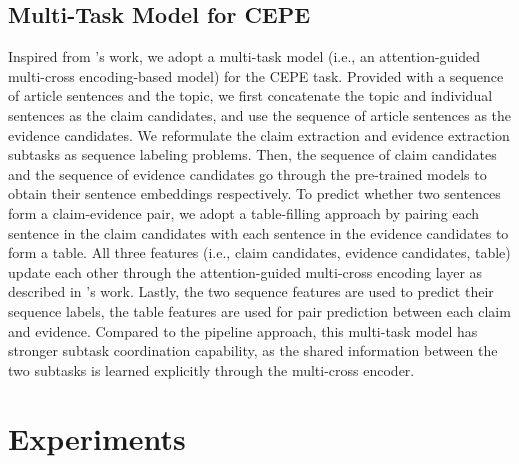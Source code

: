 \documentclass[11pt]{article}
\begin{document}
\subsection{Multi-Task Model for CEPE}
Inspired from \citet{cheng2021argument}'s work, we adopt a multi-task model (i.e., an attention-guided multi-cross encoding-based model) for the CEPE task.
Provided with a sequence of article sentences and the topic, we first concatenate the topic and individual sentences as the claim candidates, and use the sequence of article sentences as the evidence candidates.
We reformulate the claim extraction and evidence extraction subtasks as sequence labeling problems.
Then, the sequence of claim candidates and the sequence of evidence candidates go through the pre-trained models to obtain their sentence embeddings respectively.
To predict whether two sentences form a claim-evidence pair, we adopt a table-filling approach by pairing each sentence in the claim candidates with each sentence in the evidence candidates to form a table.
All three features (i.e., claim candidates, evidence candidates, table) update each other through the attention-guided multi-cross encoding layer as described in \citet{cheng2021argument}'s work.
Lastly, the two sequence features are used to predict their sequence labels, the table features are used for pair prediction between each claim and evidence.
Compared to the pipeline approach, this multi-task model has stronger subtask coordination capability, as the shared information between the two subtasks is learned explicitly through the multi-cross encoder.


\section{Experiments}
\end{document}
